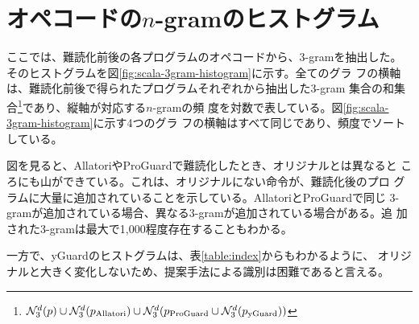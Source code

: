 \documentclass[12pt,twoside]{jbook}
\newcommand{\distinctnnn}[1]{\mathcal{N}_3^d(#1)}
\begin{document}
\section{オペコードの$n$-gramのヒストグラム}

ここでは、難読化前後の各プログラムのオペコードから、3-gramを抽出した。
そのヒストグラムを図\ref{fig:scala-3gram-histogram}に示す。全てのグラ
フの横軸は、難読化前後で得られたプログラムそれぞれから抽出した$3$-gram
集合の和集合\footnote{ $\distinctnnn{p} \cup \distinctnnn{p_{\rm
      Allatori}} \cup \distinctnnn{p_{\rm ProGuard} \cup
    \distinctnnn{p_{\rm yGuard}}}$}であり、縦軸が対応する$n$-gramの頻
度を対数で表している。図\ref{fig:scala-3gram-histogram}に示す4つのグラ
フの横軸はすべて同じであり、頻度でソートしている。

図を見ると、AllatoriやProGuardで難読化したとき、オリジナルとは異なると
ころにも山ができている。これは、オリジナルにない命令が、難読化後のプロ
グラムに大量に追加されていることを示している。AllatoriとProGuardで同じ
3-gramが追加されている場合、異なる3-gramが追加されている場合がある。追
加された3-gramは最大で1,000程度存在することもわかる。

一方で、yGuardのヒストグラムは、表\ref{table:index}からもわかるように、
オリジナルと大きく変化しないため、提案手法による識別は困難であると言える。
\end{document}
